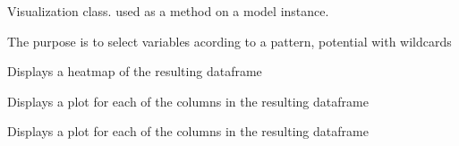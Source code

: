 \documentclass[letterpaper,10pt,english]{sphinxmanual}
\begin{document}
\begin{fulllineitems}
\label{\detokenize{index:modelvis.vis}}
\pysigstartsignatures
{}
\pysigstopsignatures
\sphinxAtStartPar
Visualization class. used as a method on a model instance.

\sphinxAtStartPar
The purpose is to select variables acording to a pattern, potential with wildcards

\begin{fulllineitems}
\label{\detokenize{index:modelvis.vis.heat}}
\pysigstartsignatures
{}
\pysigstopsignatures
\sphinxAtStartPar
Displays a heatmap of the resulting dataframe

\end{fulllineitems}


\begin{fulllineitems}
\label{\detokenize{index:modelvis.vis.plot}}
\pysigstartsignatures
{}
\pysigstopsignatures
\sphinxAtStartPar
Displays a plot for each of the columns in the resulting dataframe

\end{fulllineitems}


\begin{fulllineitems}
\label{\detokenize{index:modelvis.vis.plot_alt}}
\pysigstartsignatures
{}
\pysigstopsignatures
\sphinxAtStartPar
Displays a plot for each of the columns in the resulting dataframe


\end{fulllineitems}
\end{fulllineitems}
\end{document}
